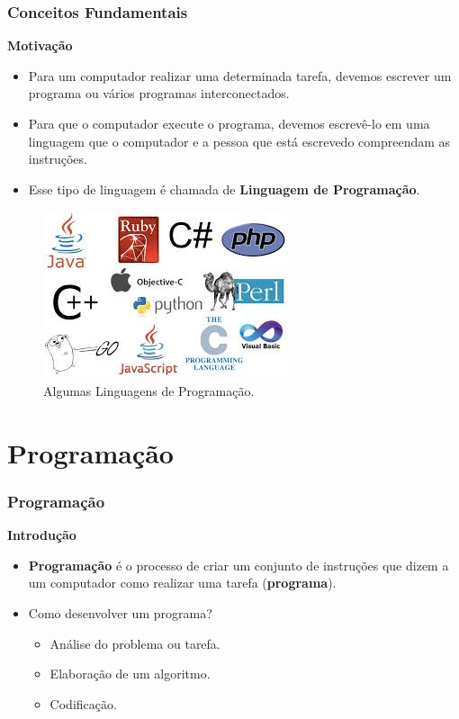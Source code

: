 \begin{frame}
	\frametitle{Conceitos Fundamentais}
	\textbf{Motivação}
	\begin{itemize}
		\item Para um computador realizar uma determinada tarefa, devemos escrever um programa ou vários programas interconectados.
		\item Para que o computador execute o programa, devemos escrevê-lo em uma linguagem que o computador e a pessoa que está escrevedo compreendam as instruções.
		\item Esse tipo de linguagem é chamada de \textbf{Linguagem de Programação}.
	\end{itemize}

	\begin{figure}
		\centering
		\includegraphics[width=.4\textwidth]{../../figuras/languages.png}
		
		\caption{Algumas Linguagens de Programação.}
		\label{fig:languages}
	\end{figure}
\end{frame}


\section{Programação}
\begin{frame}
	\frametitle{Programação}
	\textbf{Introdução}
	\begin{itemize}
		\item \textbf{Programação} é o processo de criar um conjunto de instruções que dizem a um computador como realizar uma tarefa (\textbf{programa}). 
		\item Como desenvolver um programa?
		\begin{itemize}
			\item Análise do problema ou tarefa.
			\item Elaboração de um algoritmo.
			\item Codificação.
		\end{itemize}
	\end{itemize}
\end{frame}





